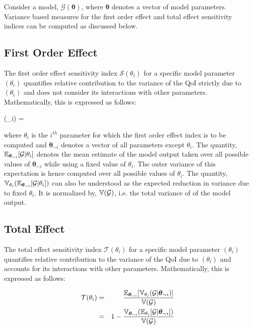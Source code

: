 Consider a model, $\mathcal{G}(\bm \theta)$, where $\bm \theta$ denotes a vector of model
parameters. Variance based measures for the first order effect and total effect sensitivity
indices can be computed as discussed below. 

\subsection{First Order Effect}

The first order effect sensitivity index $\mathcal{S}(\theta_{i})$ for a specific model
parameter $(\theta_{i})$ quantifies relative contribution to the variance of the QoI
strictly due to $(\theta_{i})$ and does not consider its interactions with other parameters.
Mathematically, this is expressed as follows:

\be
{}(\theta_{i}) = 
\ee

\noindent where $\theta_{i}$ is the $i^{th}$ parameter for which the first order effect index is to be
computed and $\bm \theta_{\sim i}$ denotes a vector of all parameters except $\theta_{i}$. The quantity,
$\operatorname{\mathbb{E}}_{\bm \theta_{\sim i}}[\mathcal{G}\vert\theta_{i}]$ denotes the mean estimate of the model output
taken over all possible values of $\bm \theta_{\sim i}$ while using a fixed value of $\theta_{i}$. The
outer variance of this expectation is hence computed over all possible values of $\theta_{i}$. 
The quantity, $\operatorname{\mathbb{V}}_{\theta_{i}}(\operatorname{\mathbb{E}}_{\bm \theta_{\sim i}}[\mathcal{G}\vert\theta_{i}])$ can also be
understood as the expected reduction in variance due to fixed $\theta_{i}$.
It is normalized by, $\operatorname{\mathbb{V}}(\mathcal{G})$, i.e. the total variance of of the model output. 

\subsection{Total Effect}

The total effect sensitivity index $\mathcal{T}(\theta_{i})$ for a specific model
parameter $(\theta_{i})$ quantifies relative contribution to the variance of the QoI
due to $(\theta_{i})$ and accounts for its interactions with other parameters.
Mathematically, this is expressed as follows:

\begin{eqnarray}
\mathcal{T}(\theta_{i}) &=& \frac{\E_{\bm \theta_{\sim i}}[\V_{\theta_{i}}(\mathcal{G}\vert\bm{\theta}_{\sim i})]}{\V(\mathcal{G})} \\ \vspace{1mm}
			&=& 1 - \frac{\V_{\bm \theta_{\sim i}}(\E_{\theta_{i}}[\mathcal{G}\vert\bm\theta_{\sim i}])}{\V(\mathcal{G})}
\end{eqnarray}

